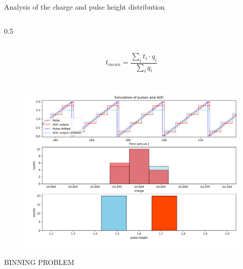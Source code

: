 \documentclass{beamer}[10pt]
\begin{document}
\begin{frame}{Analysis of the charge and pulse height distribution}
\begin{columns}
\begin{column}{0.5\framewidth}
\begin{figure}[H]
   \label{fig:wffytl}
 \end{figure}
\vspace{-7mm}
\\
{\tiny $$t_{mean}=\frac{\sum_i t_i \cdot q_i}{\sum_i q_i}$$}
\\
\vspace{-7mm}
\begin{figure}[H]
   \centering
   \includegraphics[width= 0.95\columnwidth]{figures/png/pres.png}
   \label{fig:wffytl}
 \end{figure}
BINNING PROBLEM
\end{column}
\end{columns}
\end{frame}
\end{document}
